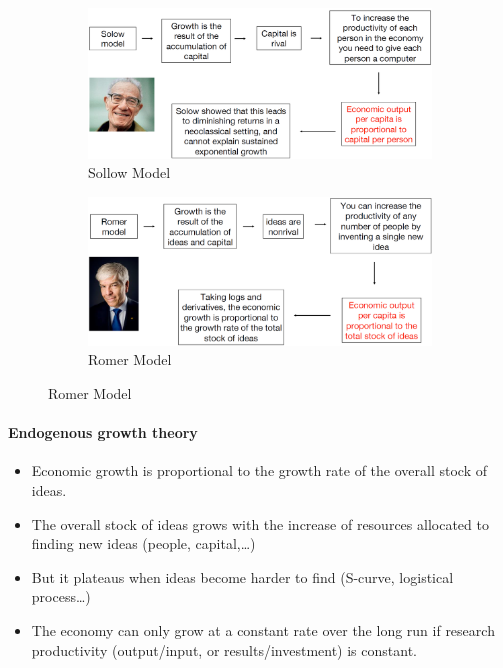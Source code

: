 \begin{figure}[h]
    \centering
    \begin{subfigure}{0.48\textwidth}
        \centering
        \includegraphics[width=\textwidth]{Pictures/Solow.png}
        \caption{Sollow Model}
    \end{subfigure}
    \hspace{5pt}
    \begin{subfigure}{0.48\textwidth}
        \centering
        \includegraphics[width=\textwidth]{Pictures/Romer.png}
        \caption{Romer Model}
    \end{subfigure}
\end{figure}

\paragraph{Endogenous growth theory}

\begin{itemize}
    \item Economic growth is proportional to the growth rate of the overall
        stock of ideas.
    \item The overall stock of ideas grows with the increase of resources
        allocated to finding new ideas (people, capital,\dots)
    \item But it plateaus when ideas become harder to find (S-curve, logistical
        process\dots)
    \item The economy can only grow at a constant rate over the long run if
        research productivity (output/input, or results/investment) is
        constant.
\end{itemize}

